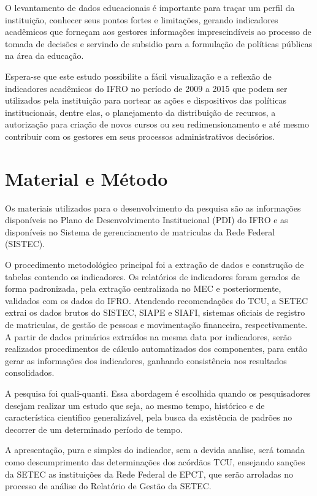 \documentclass[article,12pt,onesidea,4paper,english,brazil]{abntex2}
\begin{document}
	O levantamento de dados educacionais é importante para traçar um perfil da instituição,
	conhecer seus pontos fortes e limitações, gerando indicadores acadêmicos que forneçam aos
	gestores informações imprescindíveis ao processo de tomada de decisões e servindo de subsidio
	para a formulação de políticas públicas na área da educação.
	
	Espera-se que este estudo possibilite a fácil visualização e a reflexão de indicadores
	acadêmicos do IFRO no período de 2009 a 2015 que podem ser utilizados pela instituição para
	nortear as ações e dispositivos das políticas institucionais, dentre elas, o planejamento da
	distribuição de recursos, a autorização para criação de novos cursos ou seu redimensionamento e
	até mesmo contribuir com os gestores em seus processos administrativos decisórios.
	
	\section*{Material e Método}
	
	Os materiais utilizados para o desenvolvimento da pesquisa são as informações disponíveis
	no Plano de Desenvolvimento Institucional (PDI) do IFRO e as disponíveis no Sistema de
	gerenciamento de matriculas da Rede Federal (SISTEC).
	
	O procedimento metodológico principal foi a extração de dados e construção de tabelas
	contendo os indicadores. Os relatórios de indicadores foram gerados de forma padronizada, pela
	extração centralizada no MEC e posteriormente, validados com os dados do IFRO. Atendendo
	recomendações do TCU, a SETEC extrai os dados brutos do SISTEC, SIAPE e SIAFI, sistemas
	oficiais de registro de matriculas, de gestão de pessoas e movimentação financeira,
	respectivamente. A partir de dados primários extraídos na mesma data por indicadores, serão
	realizados procedimentos de cálculo automatizados dos componentes, para então gerar as
	informações dos indicadores, ganhando consistência nos resultados consolidados.
	
	A pesquisa foi quali-quanti. Essa abordagem é escolhida quando os pesquisadores desejam
	realizar um estudo que seja, ao mesmo tempo, histórico e de característica cientifico
	generalizável, pela busca da existência de padrões no decorrer de um determinado período de
	tempo.
	
	A apresentação, pura e simples do indicador, sem a devida analise, será tomada como
	descumprimento das determinações dos acórdãos TCU, ensejando sanções da SETEC as
	instituições da Rede Federal de EPCT, que serão arroladas no processo de análise do Relatório de
	Gestão da SETEC.
	
\end{document}
